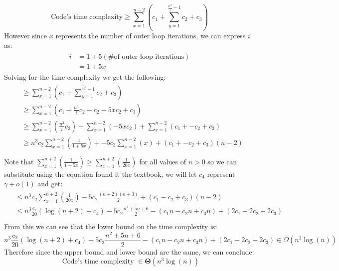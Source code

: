 \documentclass[12pt]{article}
\begin{document}
\begin{adjustwidth}{0em}{0pt}
\[ \text{Code's time complexity} \geq \sum^{n-2}_{x=1} \left( c_1 + \sum^{\frac{n^3}{i} - 1}_{y=1}c_2 + c_3 \right) \]
However since $x$ represents the number of outer loop iterations, we can express $i$ as:
\begin{align*}
    \begin{aligned}
       i &= 1 + 5 (\text{\# of outer loop iterations}) \\
       &= 1 + 5x
    \end{aligned}
\end{align*}
Solving for the time complexity we get the following:
\begin{align*}
    \begin{aligned}
       &\geq \sum^{n-2}_{x=1} \left( c_1 + \sum^{\frac{n^3}{i} - 1}_{y=1}c_2 + c_3 \right) \\
       &\geq \sum^{n-2}_{x=1} \left( c_1 + \frac{n^3}{i}c_2-c_2-5xc_2 + c_3 \right) \\
       &\geq \sum^{n-2}_{x=1} \left(\frac{n^3}{i}c_2 \right) + \sum^{n-2}_{x=1} \left(-5xc_2 \right)  + \sum^{n-2}_{x=1} \left( c_1 + -c_2 + c_3  \right) \\
       &\geq n^3c_2\sum^{n-2}_{x=1} \left(\frac{1}{1+5x}\right) + -5c_2\sum^{n-2}_{x=1} \left(x \right) + ( c_1 + -c_2 + c_3  )(n-2) \\
    \end{aligned}
\end{align*}
Note that $\sum^{n+2}_{x=1} \left(\frac{1}{1+5x}\right) \geq \sum^{n+2}_{x=1} \left(\frac{1}{20x}\right)$ for all values of $n>0$ so we can substitute using the equation found it the textbook, we will let $c_4$ represent $\gamma + o(1)$  and get:
\begin{align*}
    \begin{aligned}
       &\leq  n^3c_2\sum^{n+2}_{x=1} \left(\frac{1}{20x}\right) -5c_2\frac{(n+2)(n+3)}{2} + ( c_1 - c_2 + c_3  )(n-2) \\
       &\leq  n^3\frac{c_2}{20}(\log(n+2) + c_4) -5c_2\frac{n^2 + 5n + 6}{2} - ( c_1n -c_2n + c_3n ) + (2c_1 -2c_2+2c_3) \\
    \end{aligned}
\end{align*}
From this we can see that the lower bound on the time complexity is:
\[   n^3\frac{c_2}{20}(\log(n+2) + c_4) -5c_2\frac{n^2 + 5n + 6}{2} - ( c_1n -c_2n + c_3n ) + (2c_1 -2c_2+2c_3) \in \Omega(n^3\log(n)) \]
Therefore since the upper bound and lower bound are the same, we can conclude:
\[ \text{ Code's time complexity  } \in \bm{\Theta}(n^3\log(n)) \]
\end{adjustwidth}
\end{document}
